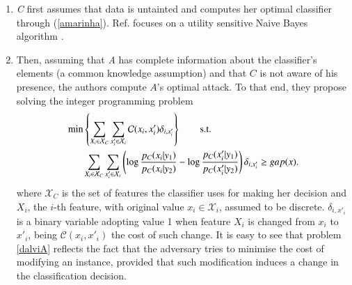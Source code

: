 \begin{enumerate}
\item \textit{C} first assumes that data is untainted and computes her optimal classifier through (\ref{amarinha}).
Ref. \cite{adversarialClassification2004} focuses on  a utility sensitive Naive Bayes algorithm \cite{elkan2001foundations}.
\item Then, assuming that \textit{A} has complete information about the classifier's elements (a common knowledge
assumption)
and that $C$ is not aware of his presence, the authors 
compute $A$'s optimal attack. 
To that end, they propose solving the integer programming  problem
\begin{align} \label{dalviA}
    \begin{split}
        \min & \left \lbrace \sum_{X_i \in \mathcal{X}_C} \sum_{x'_i \in \mathcal{X}_i} \mathcal{C}(x_i, x'_i) \delta _{i, x'_i} \right \rbrace\qquad {\rm s.t.} \\
        & \sum_{X_i \in \mathcal{X}_C} \sum_{x'_i \in \mathcal{X}_i} \left ( \log \frac{p_C(x_i|y_1)}{p_C(x_i|y_2)} - \log \frac{p_C(x'_i|y_1)}{p_C(x'_i|y_2)} \right ) \delta _{i, x'_i} \geq gap(x) .
    \end{split}
\end{align}
where $\mathcal{X}_C$ is the set of features the classifier uses for making her decision and $X_i$, the $i$-th feature, with original value $x_i \in \mathcal{X}_i$, assumed to be discrete. %
 $\delta_{i, x'_i}$ is a binary variable adopting value 1 when feature $X_i$ is changed from $x_i$ to $x'_i$, being $\mathcal{C}(x_i, x'_i)$ the cost of such change. 
It is easy to see that problem \eqref{dalviA} reflects the fact that the adversary tries to minimise the cost of modifying an instance, provided that such modification induces a change in the classification decision.

%
%



\end{enumerate}
